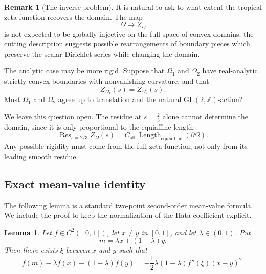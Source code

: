 \documentclass[a4paper,american,11pt]{amsart}
\theoremstyle{plain}
\newtheorem{lemma}[theorem]{Lemma}
\theoremstyle{definition}
\newtheorem{remark}[theorem]{Remark}
\newcommand{\Z}{\mathbb Z}
\DeclareMathOperator*{\Res}{Res}
\DeclareMathOperator{\Length}{Length}
\begin{document}
\begin{remark}[The inverse problem]
It is natural to ask to what extent the tropical zeta function recovers the
domain. The map
\[
\Omega\longmapsto Z_\Omega
\]
is not expected to be globally injective on the full space of convex domains:
the cutting description suggests possible rearrangements of boundary pieces
which preserve the scalar Dirichlet series while changing the domain.

The analytic case may be more rigid. Suppose that \(\Omega_1\) and
\(\Omega_2\) have real-analytic strictly convex boundaries with nonvanishing
curvature, and that
\[
Z_{\Omega_1}(s)=Z_{\Omega_2}(s).
\]
Must \(\Omega_1\) and \(\Omega_2\) agree up to translation and the natural
\(\mathrm{GL}(2,\Z)\)-action?

We leave this question open. The residue at \(s=\frac23\) alone cannot
determine the domain, since it is only proportional to the equiaffine length:
\[
\Res_{s=2/3}Z_\Omega(s)
=
C_{\mathrm{aff}}\,
\Length_{\mathrm{equiaffine}}(\partial\Omega).
\]
Any possible rigidity must come from the full zeta function, not only from
its leading smooth residue.
\end{remark}

\subsection{Exact mean-value identity}

The following lemma is a standard two-point second-order mean-value formula.
We include the proof to keep the normalization of the Hata coefficient
explicit.

\begin{lemma}\label{lem:mv}
Let \(f\in C^2([0,1])\), let \(x\neq y\) in \([0,1]\), and let
\(\lambda\in(0,1)\). Put
\[
m=\lambda x+(1-\lambda)y.
\]
Then there exists \(\xi\) between \(x\) and \(y\) such that
\[
f(m)-\lambda f(x)-(1-\lambda)f(y)
=
-\frac12\lambda(1-\lambda)f''(\xi)(x-y)^2.
\]
\end{lemma}
\end{document}

